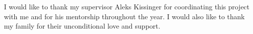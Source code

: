 \begin{acknowledgements}
  I would like to thank my supervisor Aleks Kissinger for coordinating this project with me and for his mentorship throughout the year.
  I would also like to thank my family for their unconditional love and support.
\end{acknowledgements}
